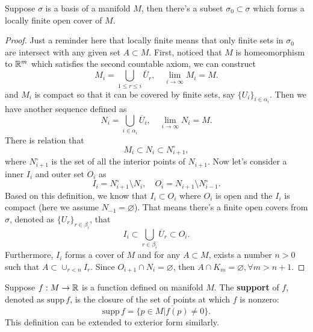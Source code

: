 \begin{theorem}
Suppose $\sigma$ is a basis of a manifold $M$, then there's a subset $\sigma_0\subset \sigma$ which forms a locally finite open cover of $M$.
\end{theorem}
\begin{proof}
Just a reminder here that locally finite means that only finite sets in $\sigma_0$ are intersect with any given set $A\subset M$.
First, noticed that $M$ is homeomorphism to $\mathbb{R}^m$ which satisfies the second countable axiom, we can construct
\begin{equation}
M_i=\bigcup_{1\le r\le i}\overline{U}_r,\quad \lim_{i\to\infty}M_i=M.
\end{equation}
and $M_i$ is compact so that it can be covered by finite sets, say $\{U_i\}_{i\in\alpha_i}$. Then we have another sequence defined as 
\begin{equation}
N_i=\bigcup_{i\in\alpha_i}\overline{U}_{i},\quad \lim_{i\to\infty}N_i=M.
\end{equation}
There is relation that
\begin{equation}
M_i\subset N_i\subset N_{i+1}^\circ,
\end{equation}
where $N_{i+1}^\circ$ is the set of all the interior points of $N_{i+1}$. Now let's consider a inner $I_i$ and outer set $O_i$ as
\begin{equation}
I_i=N^\circ_{i+1}\setminus N_i,\quad O_i=N_{i+1}\setminus N^\circ_{i-1}.
\end{equation}
Based on this definition, we know that $I_i\subset O_i$ where $O_i$ is open and the $I_i$ is compact (here we assume $N_{-1}=\varnothing$). That means there's a finite open covers from $\sigma$, denoted as $\{U_r\}_{r\in\beta_i}$, that 
\begin{equation}
I_i\subset\bigcup_{r\in\beta_i}\overline{U}_r\subset O_i.
\end{equation}
Furthermore, $I_i$ forms a cover of $M$ and for any $A\subset M$, exists a number $n>0$ such that $A\subset \cup_{r<n}I_r$. Since $O_{i+1}\cap N_i=\varnothing$, then $A\cap K_{m}=\varnothing,\forall m>n+1$. 
\end{proof}

\begin{definition}
Suppose $f:M\to\mathbb{R}$ is a function defined on manifold $M$. The \textbf{support} of $f$, denoted as $\text{supp}\,f$, is the closure of the set of points at which $f$ is nonzero:
\begin{equation}
\text{supp}\,f=\overline{\{p\in M|f(p)\ne0\}}.
\end{equation}
This definition can be extended to exterior form similarly.
\end{definition}

